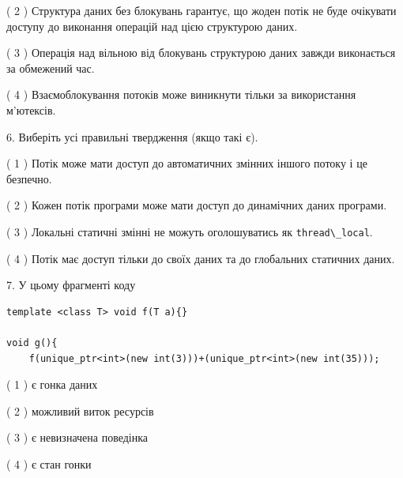 \documentclass[12pt, ukrainian]{article}
\def\code#1{\Verb!#1!}
\begin{document}
\begin {large}
{( 2 ) Структура даних без блокувань гарантує, що жоден потік не буде очікувати доступу до виконання операцій над цією структурою даних.%

( 3 ) Операція над вільною від блокувань структурою даних завжди виконається за обмежений час.%

( 4 ) Взаємоблокування потоків може виникнути тільки за використання м’ютексів.%
\newpage



\vspace{5mm}
6. Виберіть усі правильні твердження (якщо такі є).\par
\vspace{2mm}

( 1 ) Потік може мати доступ до автоматичних змінних іншого потоку і це безпечно.%

( 2 ) Кожен потік програми може мати доступ до динамічних даних програми.%

( 3 ) Локальні статичні змінні не можуть оголошуватись як \code{thread\_local}.%

( 4 ) Потік має доступ тільки до своїх даних та до глобальних статичних даних.%


\vspace{5mm}
7. У цьому фрагменті коду
\begin{verbatim}
template <class T> void f(T a){}

void g(){
    f(unique_ptr<int>(new int(3)))+(unique_ptr<int>(new int(35)));
\end{verbatim}

( 1 ) є гонка даних%

( 2 ) можливий виток ресурсів%

( 3 ) є невизначена поведінка%

( 4 ) є стан гонки%
}
\end {large}
\end{document}
